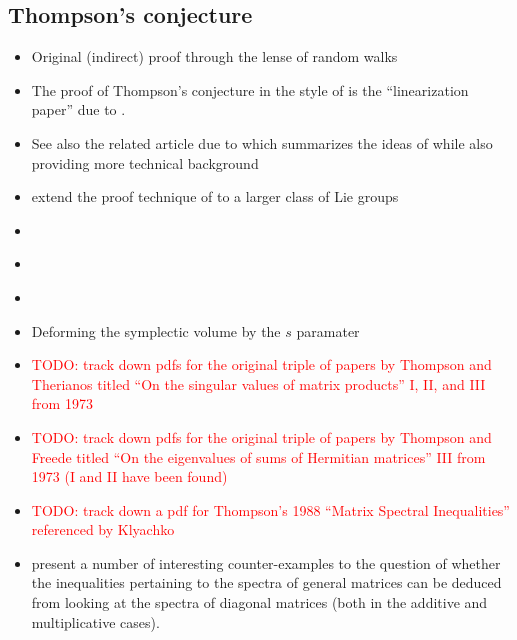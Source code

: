 \documentclass[notitlepage, 10pt]{article}
\begin{document}
\subsection{Thompson's conjecture}
\begin{itemize}
    \item Original (indirect) proof through the lense of random walks \citeauthor{klyachko2000random} \cite{klyachko2000random}
    \item The proof of Thompson's conjecture in the style of \citeauthor{alekseev2001linearization} is the ``linearization paper'' due to \cite{alekseev2001linearization}. 
    \item See also the related article due to \citeauthor{lamb2005proof} which summarizes the ideas of \cite{alekseev2001linearization} while also providing more technical background \cite{lamb2005proof}
    \item \citeauthor{lu2003thompson} extend the proof technique of \cite{alekseev2001linearization} to a larger class of Lie groups \cite{lu2003thompson}
    \item \citeauthor{alekseev2017symplectic} \cite{alekseev2017symplectic}
    \item \citeauthor{alekseev2017horn} \cite{alekseev2017horn}
    \item \citeauthor{alekseev2007ginzburg} \cite{alekseev2007ginzburg}
    \item Deforming the symplectic volume by the $s$ paramater \citeauthor{alekseev2018concentration} \cite{alekseev2018concentration}
    \item \textcolor{red}{TODO: track down pdfs for the original triple of papers by Thompson and Therianos titled ``On the singular values of matrix products'' I, II, and III from 1973}
    \item \textcolor{red}{TODO: track down pdfs for the original triple of papers by Thompson and Freede titled ``On the eigenvalues of sums of Hermitian matrices'' III from 1973 (I and II have been found)}
    \item \textcolor{red}{TODO: track down a pdf for Thompson's 1988 ``Matrix Spectral Inequalities'' referenced by Klyachko}
    \item {} \cite{thompson1973eigenvalues} present a number of interesting counter-examples to the question of whether the inequalities pertaining to the spectra of general matrices can be deduced from looking at the spectra of diagonal matrices (both in the additive and multiplicative cases).
\end{itemize}
\end{document}
